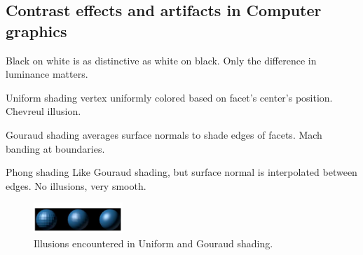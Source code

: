 \begin{mdframed}\begin{multicols}{2}
\subsection{Contrast effects and artifacts in Computer graphics}
Black on white is as distinctive as white on black. Only the difference
in luminance matters.
\begin{compactdesc}
    \item[Uniform shading] vertex uniformly colored based on facet's center's position.
        Chevreul illusion.
    \item[Gouraud shading] averages surface normals to shade edges of facets.
        Mach banding at boundaries.
    \item[Phong shading] Like Gouraud shading, but surface normal is
        interpolated between edges. No illusions, very smooth.
    \begin{figure}[H]
        \centering
        \includegraphics[width=0.3\textwidth]{shading.png}
        \caption{Illusions encountered in Uniform and Gouraud shading.}
    \end{figure}


\end{compactdesc}

\end{multicols}\end{mdframed}





